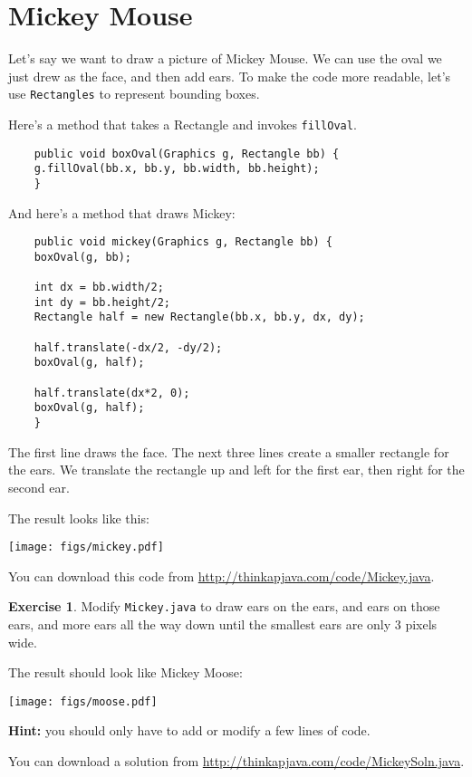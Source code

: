 \documentclass[12pt]{book}
\def\HINT{\textbf{Hint:}}
\theoremstyle{definition}
\newtheorem{excz}{Exercise}[chapter]
\newenvironment{exercise}{\bigskip\begin{excz}\mbox{}}{\end{excz}}
\begin{document}
\section{Mickey Mouse}

Let's say we want to draw a picture of Mickey Mouse.  We can use the
oval we just drew as the face, and then add ears.  To make the code
more readable, let's use {\tt Rectangles} to represent bounding boxes.

Here's a method that takes a Rectangle and invokes {\tt fillOval}.

\begin{lstlisting}
    public void boxOval(Graphics g, Rectangle bb) {
	g.fillOval(bb.x, bb.y, bb.width, bb.height);
    }
\end{lstlisting}

And here's a method that draws Mickey:

\begin{lstlisting}
    public void mickey(Graphics g, Rectangle bb) {
	boxOval(g, bb);

	int dx = bb.width/2;
	int dy = bb.height/2;
	Rectangle half = new Rectangle(bb.x, bb.y, dx, dy);

	half.translate(-dx/2, -dy/2);
	boxOval(g, half);

	half.translate(dx*2, 0);
	boxOval(g, half);
    }
\end{lstlisting}

The first line draws the face.  The next three lines create
a smaller rectangle for the ears.  We translate the rectangle
up and left for the first ear, then right for the second ear.

The result looks like this:

\texttt{[image: figs/mickey.pdf]}

You can download this code from
\url{http://thinkapjava.com/code/Mickey.java}.


\begin{exercise}
Modify {\tt Mickey.java} to draw ears on the ears, and ears on those
ears, and more ears all the way down until the smallest ears are
only 3 pixels wide.

The result should look like Mickey Moose:

\texttt{[image: figs/moose.pdf]}

\HINT{} you should only have to add or modify a few lines of code.

You can download a solution from
\url{http://thinkapjava.com/code/MickeySoln.java}.

\end{exercise}
\end{document}
